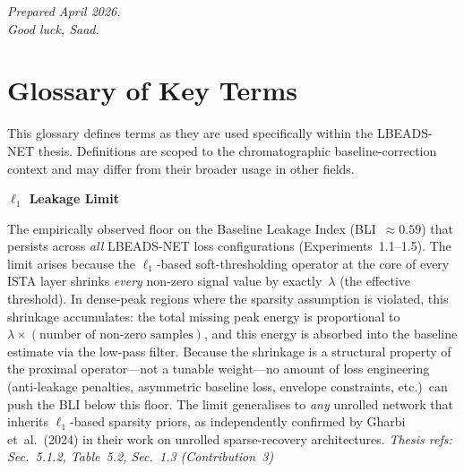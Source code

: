 \documentclass[11pt, letterpaper]{article}
\begin{document}
\vfill
\begin{center}
\small\itshape
Prepared April 2026.\\
Good luck, Saad.
\end{center}


\newpage
\section*{Glossary of Key Terms}

\begin{tcolorbox}[
  enhanced,
  colback=blue!3!white,
  colframe=SectionBlue,
  fonttitle=\bfseries\sffamily,
  title={Terms Defined in the Context of This Thesis},
  coltitle=white,
  attach boxed title to top center={yshift=-2mm},
  boxed title style={colback=SectionBlue, colframe=SectionBlue, sharp corners, size=small},
  left=6pt, right=6pt, top=6pt, bottom=6pt
]
{\small This glossary defines terms as they are used specifically within the
LBEADS-NET thesis.  Definitions are scoped to the chromatographic
baseline-correction context and may differ from their broader usage in
other fields.}
\end{tcolorbox}

\vspace{1em}

\newcommand{\glossterm}[1]{\par\vspace{0.6em}\noindent\textbf{\textsf{\textcolor{SectionBlue}{#1}}}\par\nopagebreak\vspace{0.15em}}

\glossterm{$\ell_1$ Leakage Limit}
The empirically observed floor on the Baseline Leakage Index
(BLI~$\approx 0.59$) that persists across \emph{all} LBEADS-NET loss
configurations (Experiments~1.1--1.5).  The limit arises because the
$\ell_1$-based soft-thresholding operator at the core of every ISTA layer
shrinks \emph{every} non-zero signal value by exactly~$\lambda$
(the effective threshold).  In dense-peak regions where the sparsity
assumption is violated, this shrinkage accumulates: the total missing
peak energy is proportional to $\lambda \times (\text{number of non-zero
samples})$, and this energy is absorbed into the baseline estimate via the
low-pass filter.  Because the shrinkage is a structural property of the
proximal operator---not a tunable weight---no amount of loss engineering
(anti-leakage penalties, asymmetric baseline loss, envelope constraints,
etc.)\ can push the BLI below this floor.  The limit generalises to
\emph{any} unrolled network that inherits $\ell_1$-based sparsity priors,
as independently confirmed by Gharbi et~al.\ (2024) in their work on
unrolled sparse-recovery architectures.
\hfill\textit{Thesis refs: Sec.~5.1.2, Table~5.2, Sec.~1.3 (Contribution~3)}
\end{document}
